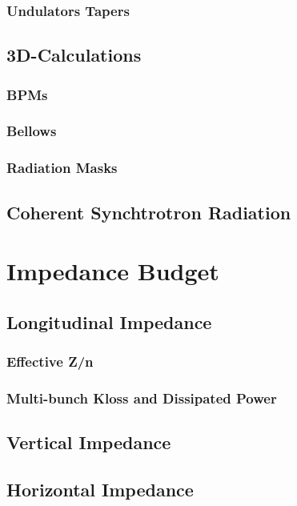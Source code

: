 \subsection{Undulators Tapers}

\section{3D-Calculations}
\subsection{BPMs}
\subsection{Bellows}
\subsection{Radiation Masks}

\section{Coherent Synchtrotron Radiation}

\chapter{Impedance Budget}
\section{Longitudinal Impedance}
\subsection{Effective Z/n}
\subsection{Multi-bunch Kloss and Dissipated Power}
\section{Vertical Impedance}
\section{Horizontal Impedance}

